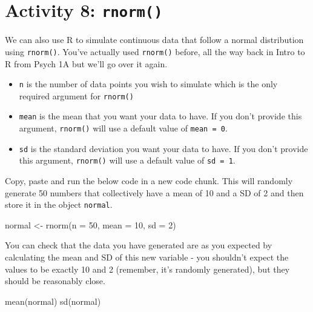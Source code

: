 \documentclass[
  oneside]{book}
\newenvironment{Shaded}{\begin{snugshade}}{\end{snugshade}}
\newcommand{\AttributeTok}[1]{\textcolor[rgb]{0.77,0.63,0.00}{#1}}
\newcommand{\DecValTok}[1]{\textcolor[rgb]{0.00,0.00,0.81}{#1}}
\newcommand{\FunctionTok}[1]{\textcolor[rgb]{0.00,0.00,0.00}{#1}}
\newcommand{\NormalTok}[1]{#1}
\newcommand{\OtherTok}[1]{\textcolor[rgb]{0.56,0.35,0.01}{#1}}
\providecommand{\tightlist}{%
  \setlength{\itemsep}{0pt}\setlength{\parskip}{0pt}}
\begin{document}
\hypertarget{activity-8-rnorm}{%
\section{\texorpdfstring{Activity 8: \texttt{rnorm()}}{Activity 8: rnorm()}}\label{activity-8-rnorm}}

We can also use R to simulate continuous data that follow a normal distribution using \texttt{rnorm()}. You've actually used \texttt{rnorm()} before, all the way back in Intro to R from Psych 1A but we'll go over it again.

\begin{itemize}
\tightlist
\item
  \texttt{n} is the number of data points you wish to simulate which is the only required argument for \texttt{rnorm()}
\item
  \texttt{mean} is the mean that you want your data to have. If you don't provide this argument, \texttt{rnorm()} will use a default value of \texttt{mean\ =\ 0}.
\item
  \texttt{sd} is the standard deviation you want your data to have. If you don't provide this argument, \texttt{rnorm()} will use a default value of \texttt{sd\ =\ 1}.
\end{itemize}

Copy, paste and run the below code in a new code chunk. This will randomly generate 50 numbers that collectively have a mean of 10 and a SD of 2 and then store it in the object \texttt{normal}.

\begin{Shaded}
\begin{Highlighting}[]
\NormalTok{normal }\OtherTok{\textless{}{-}} \FunctionTok{rnorm}\NormalTok{(}\AttributeTok{n =} \DecValTok{50}\NormalTok{, }\AttributeTok{mean =} \DecValTok{10}\NormalTok{, }\AttributeTok{sd =} \DecValTok{2}\NormalTok{)}
\end{Highlighting}
\end{Shaded}

You can check that the data you have generated are as you expected by calculating the mean and SD of this new variable - you shouldn't expect the values to be exactly 10 and 2 (remember, it's randomly generated), but they should be reasonably close.

\begin{Shaded}
\begin{Highlighting}[]
\FunctionTok{mean}\NormalTok{(normal)}
\FunctionTok{sd}\NormalTok{(normal)}
\end{Highlighting}
\end{Shaded}
\end{document}
